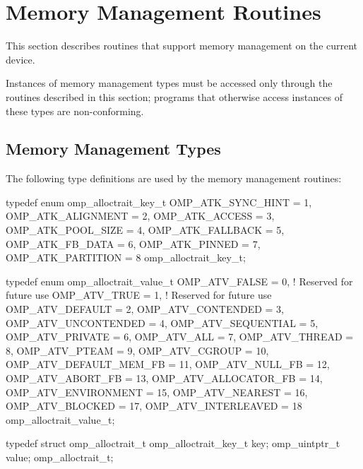 \section{Memory Management Routines}
\label{sec:Memory Management Routines}
This section describes routines that support memory management on the current device.

Instances of memory management types must be accessed only through 
the routines described in this section; programs that otherwise 
access instances of these types are non-conforming.



\subsection{Memory Management Types}
\label{subsec:Memory Management Types}

The following type definitions are used by the memory management routines:

\begin{ccppspecific}
\begin{ompEnv}
typedef enum omp_alloctrait_key_t {
  OMP_ATK_SYNC_HINT = 1,
  OMP_ATK_ALIGNMENT = 2,
  OMP_ATK_ACCESS = 3,
  OMP_ATK_POOL_SIZE = 4,
  OMP_ATK_FALLBACK = 5,
  OMP_ATK_FB_DATA = 6,
  OMP_ATK_PINNED = 7,
  OMP_ATK_PARTITION = 8
} omp_alloctrait_key_t;

typedef enum omp_alloctrait_value_t {
  OMP_ATV_FALSE = 0,  ! Reserved for future use
  OMP_ATV_TRUE = 1,   ! Reserved for future use
  OMP_ATV_DEFAULT = 2,
  OMP_ATV_CONTENDED = 3,
  OMP_ATV_UNCONTENDED = 4,
  OMP_ATV_SEQUENTIAL = 5,
  OMP_ATV_PRIVATE = 6,
  OMP_ATV_ALL = 7,
  OMP_ATV_THREAD = 8,
  OMP_ATV_PTEAM = 9,
  OMP_ATV_CGROUP = 10,
  OMP_ATV_DEFAULT_MEM_FB = 11,
  OMP_ATV_NULL_FB = 12,
  OMP_ATV_ABORT_FB = 13,
  OMP_ATV_ALLOCATOR_FB = 14,
  OMP_ATV_ENVIRONMENT = 15,
  OMP_ATV_NEAREST = 16,
  OMP_ATV_BLOCKED = 17,
  OMP_ATV_INTERLEAVED = 18
} omp_alloctrait_value_t;

typedef struct omp_alloctrait_t {
  omp_alloctrait_key_t key;
  omp_uintptr_t value;
} omp_alloctrait_t;

\end{ompEnv}
\end{ccppspecific}

